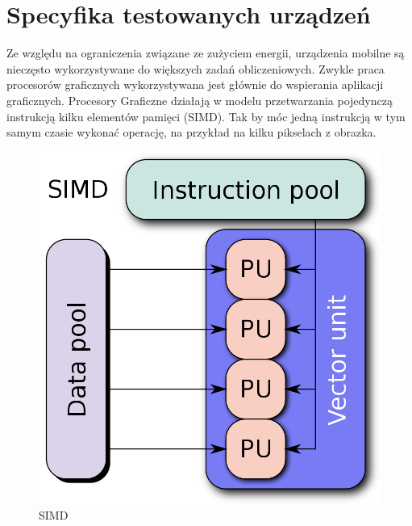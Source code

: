 \section[Specyfika testowanych urządzeń]{Specyfika testowanych urządzeń}
Ze względu na ograniczenia związane ze zużyciem energii, urządzenia mobilne są nieczęsto wykorzystywane do większych zadań obliczeniowych. Zwykle praca procesorów graficznych wykorzystywana jest głównie do wspierania aplikacji graficznych. Procesory Graficzne działają w modelu przetwarzania pojedynczą instrukcją kilku elementów pamięci (SIMD). Tak by móc jedną instrukcją w tym samym czasie wykonać operację, na przykład na kilku pikselach z obrazka. 
\begin{figure}[H]
	\includegraphics[scale=0.16]{imgs/SIMD2.svg.png}
	\caption{SIMD \cite{SIMD}}
\end{figure}

